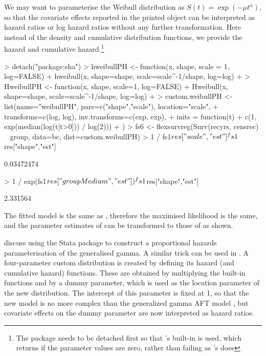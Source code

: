 \documentclass[nojss,nofooter]{jss}
\begin{document}
We may want to parameterise the Weibull distribution as $S(t) =
\exp(-\mu t^\alpha)$, so that the covariate effects reported in the
printed  object can be interpreted as hazard ratios
or log hazard ratios without any further transformation.
Here instead of the density and cumulative distribution functions, we
provide the hazard and cumulative hazard.\footnote{The  package 
needs to be detached first so that 's built-in  is used, which returns  if the parameter values are zero, rather than failing as 's does}
\begin{Schunk}
\begin{Sinput}
> detach("package:eha")
> hweibullPH <- function(x, shape, scale = 1, log=FALSE){
+     hweibull(x, shape=shape, scale=scale^{-1/shape}, log=log)
+ }
> HweibullPH <- function(x, shape, scale=1, log=FALSE){
+     Hweibull(x, shape=shape, scale=scale^{-1/shape}, log=log)
+ }
> custom.weibullPH <- list(name="weibullPH", pars=c("shape","scale"), location="scale",
+                          transforms=c(log, log), inv.transforms=c(exp, exp),
+                          inits = function(t){
+                              c(1, exp(median(log(t[t>0])) / log(2)))
+                          })
> fs6 <- flexsurvreg(Surv(recyrs, censrec) ~ group, data=bc, dist=custom.weibullPH)
> 1 / fs1$res["scale","est"]^fs1$res["shape","est"]
\end{Sinput}
\begin{Soutput}
[1] 0.03472474
\end{Soutput}
\begin{Sinput}
> 1 / exp(fs1$res["groupMedium","est"]) ^ fs1$res["shape","est"]
\end{Sinput}
\begin{Soutput}
[1] 2.331564
\end{Soutput}
\end{Schunk}
The fitted model is the same as , therefore the maximised likelihood is the same,
and the parameter estimates of  can be transformed to those of  as shown.

\citet{stgenreg} discuss using the  Stata package to
construct a proportional hazards parameterisation of the generalised
gamma.  A similar trick can be used in \citet{flexsurvreg}.  A
four-parameter custom distribution is created by defining its hazard
(and cumulative hazard) functions.  These are obtained by multiplying
the built-in functions  and  by a
dummy parameter, which is used as the location parameter of the new
distribution.  The intercept of this parameter is fixed at 1, so that
the new model is no more complex than the generalized gamma AFT model
, but covariate effects on the dummy parameter are now
interpreted as hazard ratios.
\end{document}
